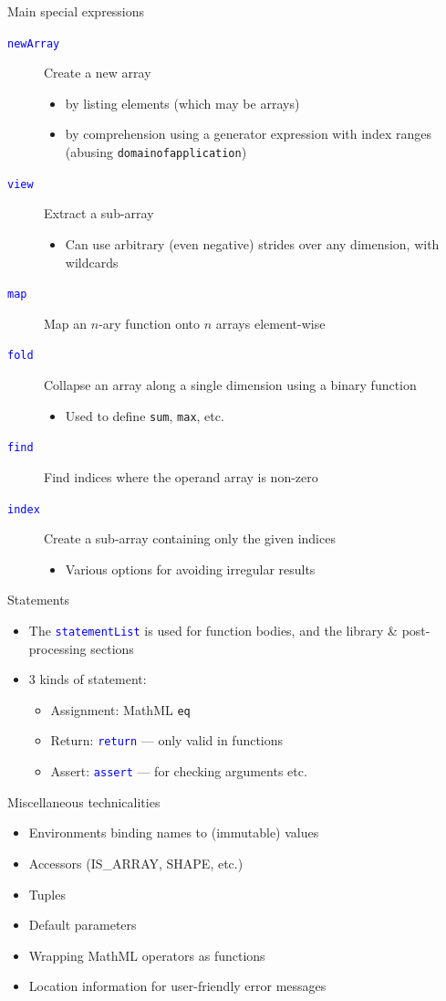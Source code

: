 \documentclass[t,xcolor={usenames,dvipsnames}]{beamer}
\newcommand{\subitem}[1]{\begin{itemize}[<.->]\item #1 \end{itemize}}
\newcommand{\csym}[1]{\textcolor{Blue}{\texttt{#1}}}
\begin{document}
\begin{frame}{Main special expressions}
\footnotesize
\begin{description}
\item[\csym{newArray}] Create a new array
  \begin{itemize}
  \item by listing elements (which may be arrays)
  \item by \alert{comprehension} using a generator expression with index ranges
  (abusing \texttt{domainofapplication})
  \end{itemize}
\item[\csym{view}] Extract a sub-array
  \subitem{Can use arbitrary (even negative) strides over any dimension, with wildcards}
\item[\csym{map}] Map an $n$-ary function onto $n$ arrays element-wise
\item[\csym{fold}] Collapse an array along a single dimension using a binary function
  \subitem{Used to define \texttt{sum}, \texttt{max}, etc.}
\item[\csym{find}] Find indices where the operand array is non-zero
\item[\csym{index}] Create a sub-array containing only the given indices
  \subitem{Various options for avoiding irregular results}
\end{description}
\end{frame}

\begin{frame}{Statements}
\begin{itemize}
\item The \csym{statementList} is used for function bodies, and the library \& post-processing sections
\item 3 kinds of statement:
  \begin{itemize}
  \item Assignment: MathML \texttt{eq}
  \item Return: \csym{return} --- only valid in functions
  \item Assert: \csym{assert} --- for checking arguments etc.
  \end{itemize}
\end{itemize}
\end{frame}

\begin{frame}{Miscellaneous technicalities}
\begin{itemize}
\item Environments binding names to (immutable) values
\item Accessors (IS\_ARRAY, SHAPE, etc.)
\item Tuples
\item Default parameters
\item Wrapping MathML operators as functions
\item Location information for user-friendly error messages
\end{itemize}
\end{frame}
\end{document}
